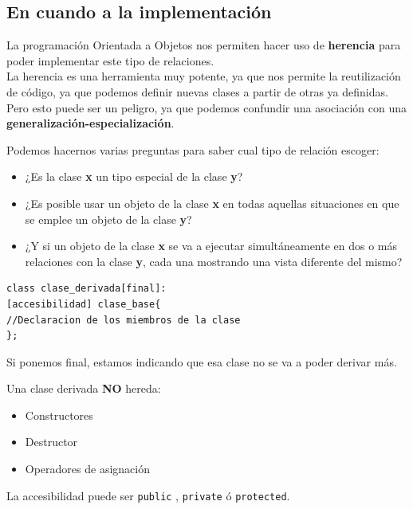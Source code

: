 \subsection{En cuando a la implementación}
La programación Orientada a Objetos nos permiten hacer uso de \textbf{herencia} para poder implementar este tipo de relaciones.\\
La herencia es una herramienta muy potente, ya que nos permite la reutilización de código, ya que podemos definir nuevas clases a partir de otras ya definidas.\\
Pero esto puede ser un peligro, ya que podemos confundir una asociación con una \textbf{generalización-especialización}.

Podemos hacernos varias preguntas para saber cual tipo de relación escoger:
\begin{itemize}
	\item ¿Es la clase \textbf{x} un tipo especial de la clase \textbf{y}?
	\item ¿Es posible usar un objeto de la clase \textbf{x} en todas aquellas situaciones en que se emplee un objeto de la clase \textbf{y}?
	\item ¿Y si un objeto de la clase \textbf{x} se va a ejecutar simultáneamente en dos o más relaciones con la clase \textbf{y}, cada una mostrando una vista diferente del mismo?
\end{itemize}

\begin{minipage}[t]{0.5\textwidth}
	\begin{lstlisting}[frame=single]
class clase_derivada[final]:
[accesibilidad] clase_base{
//Declaracion de los miembros de la clase
};
	\end{lstlisting}
Si ponemos final, estamos indicando que esa clase no se va a poder derivar más.
\end{minipage}
\hfill
\begin{minipage}[t]{0.41\textwidth}
Una clase derivada \textbf{NO} hereda:
	\begin{itemize}
		\item Constructores
		\item Destructor
		\item Operadores de asignación
	\end{itemize}
\end{minipage}

La accesibilidad puede ser \texttt{public} , \texttt{private} ó \texttt{protected}.\vspace*{0.4cm}

